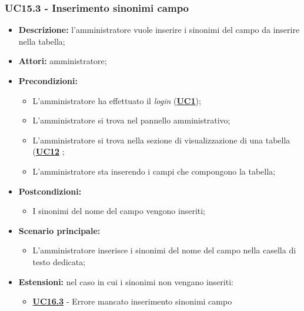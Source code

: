 \subsubsection{UC15.3 - Inserimento sinonimi campo}
\label{sec:UC15.3}
\begin{itemize}
	\item \textbf{Descrizione:} l’amministratore vuole inserire i sinonimi del campo da inserire nella tabella;
	\item \textbf{Attori:} amministratore;
	\item \textbf{Precondizioni:} 
	\begin{itemize}
		\item L’amministratore ha effettuato il \textit{login} (\hyperref[sec:UC1]{\textbf{UC1}});
		\item L’amministratore si trova nel pannello amministrativo;
		\item L’amministratore si trova nella sezione di visualizzazione di una tabella (\hyperref[sec:UC12]{\textbf{UC12}} ;
		\item L’amministratore sta inserendo i campi che compongono la tabella;
	\end{itemize}
	\item \textbf{Postcondizioni:} 
	\begin{itemize}
		\item I sinonimi del nome del campo vengono inseriti;
	\end{itemize}
	\item \textbf{Scenario principale:} 
	\begin{itemize}
		\item L’amministratore inserisce i sinonimi del nome del campo nella casella di testo dedicata;
	\end{itemize}
	\item \textbf{Estensioni:} nel caso in cui i sinonimi non vengano inseriti:
	\begin{itemize}
		\item \hyperref[sec:UC16.3]{\textbf{UC16.3}} - Errore mancato inserimento sinonimi campo
	\end{itemize}
\end{itemize}


